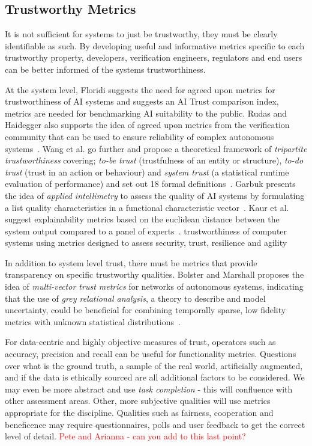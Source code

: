 \subsection{Trustworthy Metrics}

It is not sufficient for systems to just be trustworthy, they must be clearly identifiable as such. By developing useful and informative metrics specific to each trustworthy property, developers, verification engineers, regulators and end users can be better informed of the systems trustworthiness.

At the system level, Floridi suggests the need for agreed upon metrics for trustworthiness of AI systems and suggests an  AI Trust comparison index, metrics are needed for benchmarking AI suitability to the public. 
%
Rudas and Haidegger also supports the idea of agreed upon metrics from the verification community that can be used to ensure reliability of complex autonomous systems~\cite{Rudas2020}. Wang et al. go further and propose a  theoretical framework of \emph{tripartite trustworthiness} covering; \emph{to-be trust} (trustfulness of an entity or structure), \emph{to-do trust} (trust in an action or behaviour) and \emph{system trust} (a statistical runtime evaluation of performance) and set out 18 formal definitions~\cite{Wang2020}. 
%
Garbuk presents the idea of \emph{applied intellimetry} to assess the quality of AI systems by formulating a list quality characteristics in a functional characteristic vector~\cite{garbuk2018intellimetry}. 
%
Kaur et al. suggest explainability metrics based on the euclidean distance between the system output compared to a panel of experts~\cite{kaur2021trustworthy}. 
%
trustworthiness of computer systems using metrics designed to assess security, trust, resilience and agility~\cite{cho2019stram}


In addition to system level trust, there must be metrics that provide transparency on specific trustworthy qualities. 
%
Bolster and Marshall proposes the idea of \emph{multi-vector trust metrics} for networks of autonomous systems, indicating that the use of \emph{grey relational analysis}, a theory to describe and model uncertainty, could be beneficial for combining temporally sparse, low fidelity metrics with unknown statistical distributions~\cite{Bolster2014}. 

For data-centric and highly objective measures of trust, operators such as accuracy, precision and recall can be useful for functionality metrics. Questions over what is the ground truth, a sample of the real world, artificially augmented, and if the data is ethically sourced are all additional factors to be considered. We may even be more abstract and use \emph{task completion} - this will confluence with other assessment areas. 
%
Other, more subjective qualities will use metrics appropriate for the discipline. Qualities such as fairness, cooperation and beneficence may require questionnaires, polls and user feedback to get the correct level of detail. 
%
\textcolor{red}{Pete and Arianna - can you add to this last point?}


